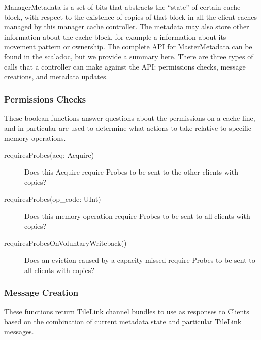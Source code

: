 ManagerMetadata is a set of bits that abstracts the “state” of certain cache block,
with respect to the existence of copies of that block in all the client caches
managed by this manager cache controller.
The metadata may also store other information about the cache block,
for example a information about its movement pattern or ownership.
The complete API for MasterMetadata can be found in the scaladoc,
but we provide a summary here.
There are three types of calls that a controller can make against the API:
permissions checks, message creations, and metadata updates.

\subsubsection{Permissions Checks}

These boolean functions answer questions about the permissions on a cache line, and in particular are used to determine what actions to take relative to specific memory operations.

\begin{description}
\item[requiresProbes(acq: Acquire) ]
Does this Acquire require Probes to be sent to the other clients with copies?
\item[requiresProbes(op\_code: UInt) ]
Does this memory operation require Probes to be sent to all clients with copies?
\item[requiresProbesOnVoluntaryWriteback() ]
 Does an eviction caused by a capacity missed require Probes to be sent to all clients with copies?
\end{description}

\subsubsection{Message Creation}

These functions return TileLink channel bundles to use as responses to Clients based on the combination of current metadata state and particular TileLink messages.

